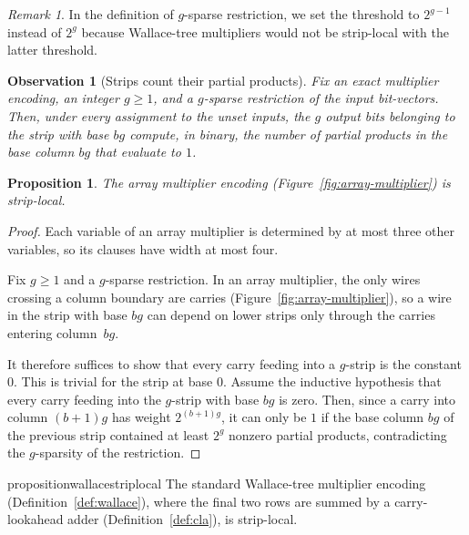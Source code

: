 \documentclass[11pt]{article}
\newtheorem{proposition}[theorem]{Proposition}
\newtheorem{observation}[theorem]{Observation}
\theoremstyle{definition}
\theoremstyle{remark}
\newtheorem{remark}[theorem]{Remark}
\begin{document}
\begin{remark}
	In the definition of $g$-sparse restriction, we set the threshold to $2^{g-1}$ instead of $2^g$ because Wallace-tree multipliers would not be strip-local with
	the latter threshold.
\end{remark}

\begin{observation}[Strips count their partial products]
\label{obs:strip-counts}
Fix an exact multiplier encoding, an integer $g\ge 1$, and a $g$-sparse restriction of the input bit-vectors. Then, under every assignment
to the unset inputs, the $g$ output bits belonging to the strip with base $bg$ compute, in binary, the number of partial products in the base
column $bg$ that evaluate to $1$.
\end{observation}

\begin{proposition}
\label{prop:array-strip-local}
The array multiplier encoding (Figure~\ref{fig:array-multiplier}) is strip-local.
\end{proposition}

\begin{proof}
Each variable of an array multiplier is determined by at most three other variables, so its clauses have width at most four.
 
Fix $g\ge1$ and a $g$-sparse restriction. In an array multiplier, the only wires crossing a column boundary are carries
(Figure~\ref{fig:array-multiplier}), so a wire in the strip with
base $bg$ can depend on lower strips only through the carries entering
column~$bg$.

It therefore suffices to show that every carry feeding into a $g$-strip is
the constant $0$. This is trivial for the strip at base $0$. Assume the inductive hypothesis that every carry feeding into the $g$-strip
with base $bg$ is zero. Then, since a carry into column $(b+1)g$ has weight $2^{(b+1)g}$, it can only be $1$ if the base column $bg$ of the previous strip
contained at least $2^{g}$ nonzero partial products, contradicting the $g$-sparsity of the restriction.
\end{proof}

\begin{restatable}{proposition}{wallacestriplocal}
\label{prop:wallace-strip-local}
The standard Wallace-tree multiplier encoding (Definition~\ref{def:wallace}), where the final two rows are summed by a
carry-lookahead adder (Definition~\ref{def:cla}), is strip-local.
\end{restatable}
\end{document}
